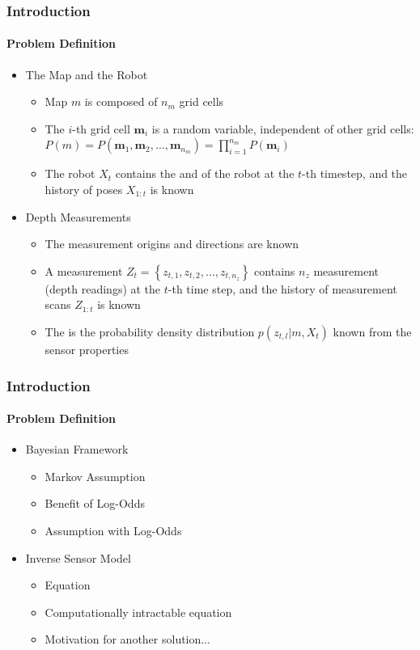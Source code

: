 \documentclass[11pt,professionalfonts,hyperref={pdftex,pdfpagemode=none,pdfstartview=FitH}]{beamer}
\newcommand{\braces}[1]{\ensuremath{\left\{ #1 \right\}}}
\renewcommand{\emph}[1]{\textit{\textbf{\color{blue}{#1}}}}
\begin{document}
\begin{frame}
\frametitle{Introduction}
\framesubtitle{Problem Definition}

\begin{itemize}
	\item The Map and the Robot
	\begin{itemize}
	\item Map $m$ is composed of $n_m$ grid cells
	\item The $i$-th grid cell $\mathbf{m}_i$ is a \emph{binary} random variable, independent of other grid cells: $P(m)=P(\mathbf{m}_1,\mathbf{m}_2,\ldots,\mathbf{m}_{n_m})=\prod_{i=1}^{n_m}P(\mathbf{m}_i)$
	\item The robot \emph{pose} $X_t$ contains the \emph{position} and \emph{attitude} of the robot at the $t$-th timestep, and the history of poses $X_{1:t}$ is known	
	\end{itemize}
\vspace*{0.3cm}\pause
	\item Depth Measurements
	\begin{itemize}
	\item The measurement origins and directions are known \emph{deterministically}
	\item A measurement \emph{scan} $Z_t=\braces{z_{t,1},z_{t,2},\ldots,z_{t,n_z}}$ contains $n_z$ measurement \emph{rays} (depth readings) at the $t$-th time step, and the history of measurement scans $Z_{1:t}$ is known
	\item The \emph{forward sensor model} is the probability density distribution $p(z_{t,l}|m,X_{t})$  known from the sensor properties
	\end{itemize}
\end{itemize}

\end{frame}

\begin{frame}
\frametitle{Introduction}
\framesubtitle{Problem Definition}

\begin{itemize}
	\item Bayesian Framework
	\begin{itemize}
	\item Markov Assumption
	\item Benefit of Log-Odds
	\item Assumption with Log-Odds
	\end{itemize}
\vspace*{0.3cm}\pause
	\item Inverse Sensor Model
	\begin{itemize}
	\item Equation
	\item Computationally intractable equation
	\item Motivation for another solution...
	\end{itemize}
\end{itemize}

\end{frame}
\end{document}
